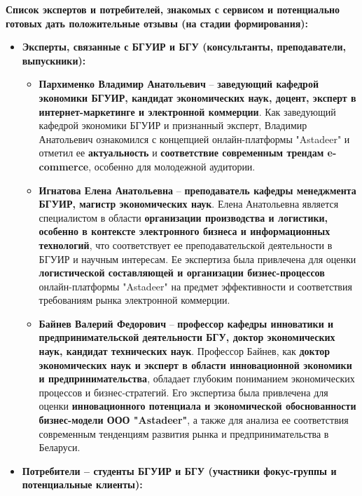 \vspace{0.3cm}

\textbf{Список экспертов и потребителей, знакомых с сервисом и потенциально готовых дать положительные отзывы (на стадии формирования):}

\begin{itemize}
    \item \textbf{Эксперты, связанные с БГУИР и БГУ (консультанты, преподаватели, выпускники):}
        \begin{itemize}
            \item \textbf{Пархименко Владимир Анатольевич} – \textbf{заведующий кафедрой экономики БГУИР, кандидат экономических наук, доцент, эксперт в интернет-маркетинге и электронной коммерции}.  Как заведующий кафедрой экономики БГУИР и признанный эксперт, Владимир Анатольевич ознакомился с концепцией онлайн-платформы "Astadeer" и отметил ее \textbf{актуальность} и \textbf{соответствие современным трендам e-commerce}, особенно для молодежной аудитории.
            \item \textbf{Игнатова Елена Анатольевна} – \textbf{преподаватель кафедры менеджмента БГУИР, магистр экономических наук}. Елена Анатольевна является специалистом в области \textbf{организации производства и логистики, особенно в контексте электронного бизнеса и информационных технологий}, что соответствует ее преподавательской деятельности в БГУИР и научным интересам.  Ее экспертиза была привлечена для оценки \textbf{логистической составляющей и организации бизнес-процессов} онлайн-платформы "Astadeer" на предмет эффективности и соответствия требованиям рынка электронной коммерции.
            \item \textbf{Байнев Валерий Федорович} – \textbf{профессор кафедры инноватики и предпринимательской деятельности БГУ, доктор экономических наук, кандидат технических наук}.  Профессор Байнев, как \textbf{доктор экономических наук и эксперт в области инновационной экономики и предпринимательства}, обладает глубоким пониманием экономических процессов и бизнес-стратегий.  Его экспертиза была привлечена для оценки \textbf{инновационного потенциала и экономической обоснованности бизнес-модели ООО "Astadeer"}, а также для анализа ее соответствия современным тенденциям развития рынка и предпринимательства в Беларуси.
        \end{itemize}
    \item \textbf{Потребители – студенты БГУИР и БГУ (участники фокус-группы и потенциальные клиенты):}
        \begin{itemize}

\end{itemize}
\end{itemize}
